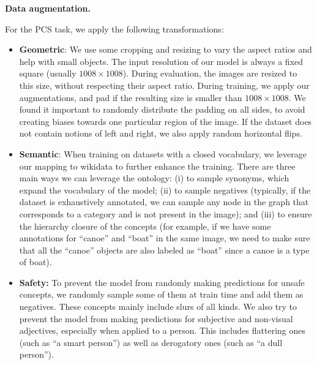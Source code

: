 \documentclass[]{fairmeta}
\renewcommand{\paragraph}[1]{%
	\noindent\textbf{#1.}\noindent\xspace%
}
\begin{document}
\paragraph{Data augmentation}
For the PCS task, we apply the following transformations:
\begin{itemize}
	\item \textbf{Geometric}: We use some cropping and resizing to vary the aspect ratios and help with small objects. The input resolution of our model is always a fixed square (usually $1008\times 1008$). During evaluation, the images are resized to this size, without respecting their aspect ratio. During training, we apply our augmentations, and pad if the resulting size is smaller than $1008\times 1008$. We found it important to randomly distribute the padding on all sides, to avoid creating biases towards one particular region of the image. If the dataset does not contain notions of left and right, we also apply random horizontal flips.
	\item \textbf{Semantic}: When training on datasets with a closed vocabulary, we leverage our mapping to wikidata to further enhance the training. There are three main ways we can leverage the ontology: (i) to sample synonyms, which expand the vocabulary of the model; (ii) to sample negatives (typically, if the dataset is exhaustively annotated, we can sample any node in the graph that corresponds to a category and is not present in the image); and (iii) to ensure the hierarchy closure of the concepts (for example, if we have some annotations for ``canoe'' and ``boat'' in the same image, we need to make sure that all the ``canoe'' objects are also labeled as ``boat'' since a canoe is a type of boat).
	\item \textbf{Safety:} To prevent the model from randomly making predictions for unsafe concepts, we randomly sample some of them at train time and add them as negatives. These concepts mainly include slurs of all kinds. We also try to prevent the model from making predictions for subjective and non-visual adjectives, especially when applied to a person. This includes flattering ones (such as ``a smart person'') as well as derogatory ones (such as ``a dull person'').

\end{itemize}
\end{document}
